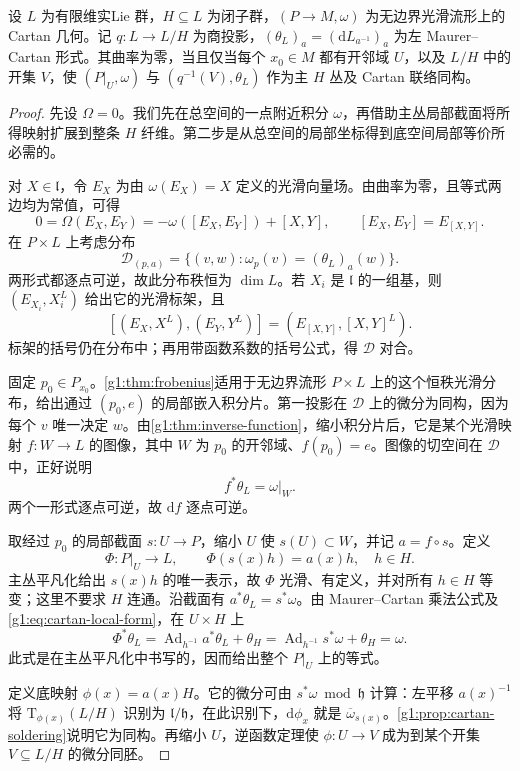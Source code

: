 \begin{theorem}\label{g1:thm:flat-cartan-local-model}
	设 \(L\) 为有限维实Lie 群，\(H\subseteq L\) 为闭子群，\((P\to M,\omega)\) 为无边界光滑流形上的 Cartan 几何。记 \(q:L\to L/H\) 为商投影，\((\theta_L)_a=(\mathrm dL_{a^{-1}})_a\) 为左 Maurer--Cartan 形式。其曲率为零，当且仅当每个 \(x_0\in M\) 都有开邻域 \(U\)，以及 \(L/H\) 中的开集 \(V\)，使 \((P|_U,\omega)\) 与 \((q^{-1}(V),\theta_L)\) 作为主 \(H\) 丛及 Cartan 联络同构。
\end{theorem}
\begin{proof}
	先设 \(\Omega=0\)。我们先在总空间的一点附近积分 \(\omega\)，再借助主丛局部截面将所得映射扩展到整条 \(H\) 纤维。第二步是从总空间的局部坐标得到底空间局部等价所必需的。

	对 \(X\in\mathfrak l\)，令 \(E_X\) 为由 \(\omega(E_X)=X\) 定义的光滑向量场。由曲率为零，且等式两边均为常值，可得
	\[
		0=\Omega(E_X,E_Y)
		=-\omega([E_X,E_Y])+[X,Y],
		\qquad [E_X,E_Y]=E_{[X,Y]}.
	\]
	在 \(P\times L\) 上考虑分布
	\[
		\mathcal D_{(p,a)}
		=\{(v,w):\omega_p(v)=(\theta_L)_a(w)\}.
	\]
	两形式都逐点可逆，故此分布秩恒为 \(\dim L\)。若 \(X_i\) 是 \(\mathfrak l\) 的一组基，则 \((E_{X_i},X_i^L)\) 给出它的光滑标架，且
	\[
		[(E_X,X^L),(E_Y,Y^L)]
		=(E_{[X,Y]},[X,Y]^L).
	\]
	标架的括号仍在分布中；再用带函数系数的括号公式，得 \(\mathcal D\) 对合。

	固定 \(p_0\in P_{x_0}\)。\cref{g1:thm:frobenius}适用于无边界流形 \(P\times L\) 上的这个恒秩光滑分布，给出通过 \((p_0,e)\) 的局部嵌入积分片。第一投影在 \(\mathcal D\) 上的微分为同构，因为每个 \(v\) 唯一决定 \(w\)。由\cref{g1:thm:inverse-function}，缩小积分片后，它是某个光滑映射 \(f:W\to L\) 的图像，其中 \(W\) 为 \(p_0\) 的开邻域、\(f(p_0)=e\)。图像的切空间在 \(\mathcal D\) 中，正好说明
	\[
		f^*\theta_L=\omega|_W.
	\]
	两个一形式逐点可逆，故 \(\mathrm{d}f\) 逐点可逆。

	取经过 \(p_0\) 的局部截面 \(s:U\to P\)，缩小 \(U\) 使 \(s(U)\subset W\)，并记 \(a=f\circ s\)。定义
	\[
		\Phi:P|_U\longrightarrow L,\qquad
		\Phi(s(x)h)=a(x)h,\quad h\in H.
	\]
	主丛平凡化给出 \(s(x)h\) 的唯一表示，故 \(\Phi\) 光滑、有定义，并对所有 \(h\in H\) 等变；这里不要求 \(H\) 连通。沿截面有 \(a^*\theta_L=s^*\omega\)。由 Maurer--Cartan 乘法公式及\eqref{g1:eq:cartan-local-form}，在 \(U\times H\) 上
	\[
		\Phi^*\theta_L
		=\operatorname{Ad}_{h^{-1}}a^*\theta_L+\theta_H
		=\operatorname{Ad}_{h^{-1}}s^*\omega+\theta_H
		=\omega.
	\]
	此式是在主丛平凡化中书写的，因而给出整个 \(P|_U\) 上的等式。

	定义底映射 \(\phi(x)=a(x)H\)。它的微分可由 \(s^*\omega\bmod\mathfrak h\) 计算：左平移 \(a(x)^{-1}\) 将 \(\mathrm{T}_{\phi(x)}(L/H)\) 识别为 \(\mathfrak l/\mathfrak h\)，在此识别下，\(\mathrm{d}\phi_x\) 就是 \(\overline\omega_{s(x)}\)。\cref{g1:prop:cartan-soldering}说明它为同构。再缩小 \(U\)，逆函数定理使 \(\phi:U\to V\) 成为到某个开集 \(V\subseteq L/H\) 的微分同胚。


\end{proof}
